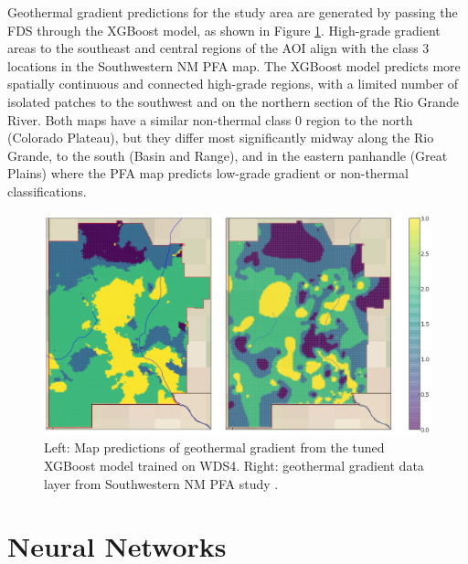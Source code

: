 Geothermal gradient predictions for the study area are generated by passing the FDS through the XGBoost model, as shown in Figure \ref{fig:xgb_final_map}. High-grade gradient areas to the southeast and central regions of the AOI align with the class 3 locations in the \citet{bielicki_hydrogeolgic_2015} Southwestern NM PFA map. The XGBoost model predicts more spatially continuous and connected high-grade regions, with a limited number of isolated patches to the southwest and on the northern section of the Rio Grande River. Both maps have a similar non-thermal class 0 region to the north (Colorado Plateau), but they differ most significantly midway along the Rio Grande, to the south (Basin and Range), and in the eastern panhandle (Great Plains) where the PFA map predicts low-grade gradient or non-thermal classifications.

\begin{figure}[!htp]
\centering
\includegraphics[width=\textwidth]{templates/images/Figure-XGB-FinalMap_Joint.png}
\caption[XGBoost prediction map]{Left: Map predictions of geothermal gradient from the tuned XGBoost model trained on WDS4. Right: geothermal gradient data layer from Southwestern NM PFA study \protect\citep{bielicki_hydrogeolgic_2015}.}
\label{fig:xgb_final_map}
\end{figure}

\section{Neural Networks}\label{ch5:ann_model}
